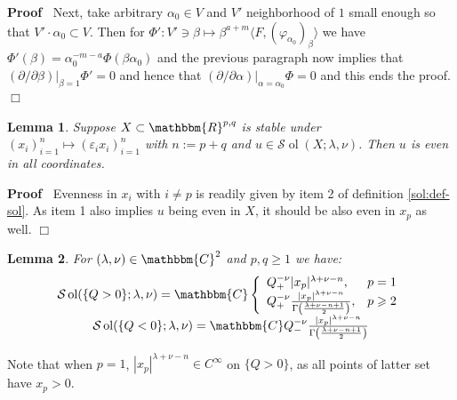 \documentclass{article}
\newcommand{\assign}{:=}
\newcommand{\tmop}[1]{\ensuremath{\operatorname{#1}}}
\newenvironment{proof}{\noindent\textbf{Proof\ }}{\hspace*{\fill}$\Box$\medskip}
\numberwithin{definition}{section}
\newtheorem{lemma}{Lemma}
\numberwithin{lemma}{section}
\numberwithin{proposition}{section}
{\theorembodyfont{\rmfamily}\newtheorem{remark}{Remark}
\numberwithin{remark}{section}
}
\begin{document}
\begin{proof}
  Next, take arbitrary $\alpha_0 \in V$ and $V'$ neighborhood of $1$ small
  enough so that $V' \cdot \alpha_0 \subset V$. Then for $\Phi' : V' \ni \beta
  \mapsto \beta^{a + m} \langle F, ( \varphi_{\alpha_0})_{\beta} \rangle$ we
  have $\Phi' ( \beta) = \alpha_0^{- m - a} \Phi ( \beta \alpha_0)$ and the
  previous paragraph now implies that $( \partial / \partial \beta) |_{\beta =
  1} \Phi' = 0$ and hence that $( \partial / \partial \alpha) |_{\alpha =
  \alpha_0} \Phi = 0$ and this ends the proof.
\end{proof}

\begin{lemma}
  \label{lem67:lem-eveninall}Suppose $X \subset \mathbbm{R}^{p, q}$ is stable
  under $( x_i)_{i = 1}^n \mapsto ( \varepsilon_i x_i)_{i = 1}^n$ with $n
  \assign p + q$ and $u \in \mathcal{S} \tmop{ol} ( X ; \lambda, \nu)$. Then
  $u$ is even in all coordinates.
\end{lemma}

\begin{proof}
  Evenness in $x_i$ with $i \neq p$ is readily given by item 2 of definition
  \ref{sol:def-sol}. As item 1 also implies $u$ being even in $X$, it should
  be also even in $x_p$ as well.
\end{proof}

\begin{lemma}
  \label{lem67:lem-Qpm}For $( \lambda, \nu) \in \mathbbm{C}^2$ and $p, q
  \geqslant 1$ we have:
  \[ \begin{array}{c}
       \mathcal{S} \tmop{ol} ( \{ Q > 0 \} ; \lambda, \nu) =\mathbbm{C}
       \left\{ \begin{array}{ll}
         Q_+^{- \nu} | x_p |^{\lambda + \nu - n}, & p = 1\\
         Q_+^{- \nu} \frac{| x_p |^{\lambda + \nu - n}}{\Gamma \left(
         \frac{\lambda + \nu - n + 1}{2} \right)}, & p \geqslant 2
       \end{array} \right.\\
       \mathcal{S} \tmop{ol} ( \{ Q < 0 \} ; \lambda, \nu) =\mathbbm{C}Q_-^{-
       \nu} \frac{| x_p |^{\lambda + \nu - n}}{\Gamma \left( \frac{\lambda +
       \nu - n + 1}{2} \right)}
     \end{array} \]
\end{lemma}

\begin{remark}
  Note that when $p = 1$, $| x_p |^{\lambda + \nu - n} \in C^{\infty}$ on $\{
  Q > 0 \}$, as all points of latter set have $x_p > 0$.
\end{remark}
\end{document}
